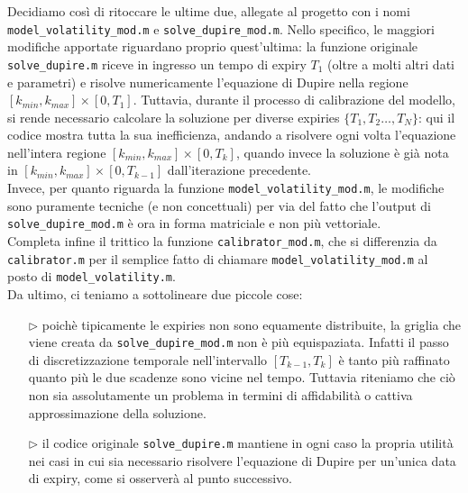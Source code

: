 \documentclass[11pt]{article}
\begin{document}
Decidiamo così di ritoccare le ultime due, allegate al progetto con i nomi \texttt{model\_volatility\_mod.m} e \texttt{solve\_dupire\_mod.m}. Nello specifico, le maggiori modifiche apportate riguardano proprio quest'ultima: la funzione originale \texttt{solve\_dupire.m} riceve in ingresso un tempo di expiry $T_1$ (oltre a molti altri dati e parametri) e risolve numericamente l'equazione di Dupire nella regione $[k_{min},k_{max}]\times[0,T_1]$. Tuttavia, durante il processo di calibrazione del modello, si rende necessario calcolare la soluzione per diverse expiries $\{T_1, T_2\dots, T_N\}$: qui il codice mostra tutta la sua inefficienza, andando a risolvere ogni volta l'equazione nell'intera regione $[k_{min},k_{max}]\times[0,T_k]$, quando invece la soluzione è già nota in $[k_{min},k_{max}]\times[0,T_{k-1}]$ dall'iterazione precedente.\\

Invece, per quanto riguarda la funzione \texttt{model\_volatility\_mod.m}, le modifiche sono puramente tecniche (e non concettuali) per via del fatto che l'output di \texttt{solve\_dupire\_mod.m} è ora in forma matriciale e non più vettoriale.\\

Completa infine il trittico la funzione \texttt{calibrator\_mod.m}, che si differenzia da \texttt{calibrator.m} per il semplice fatto di chiamare \texttt{model\_volatility\_mod.m} al posto di \texttt{model\_volatility.m}.\\

Da ultimo, ci teniamo a sottolineare due piccole cose:

\begin{itemize}
	\item[$\rhd$] poichè tipicamente le expiries non sono equamente distribuite, la griglia che viene creata da \texttt{solve\_dupire\_mod.m} non è più equispaziata. Infatti il passo di discretizzazione temporale nell'intervallo $[T_{k-1},T_k]$ è tanto più raffinato quanto più le due scadenze sono vicine nel tempo. Tuttavia riteniamo che ciò non sia assolutamente un problema in termini di affidabilità o cattiva approssimazione della soluzione.

	\item[$\rhd$] il codice originale \texttt{solve\_dupire.m} mantiene in ogni caso la propria utilità nei casi in cui sia necessario risolvere l'equazione di Dupire per un'unica data di expiry, come si osserverà al punto successivo.
\end{itemize}
\end{document}
